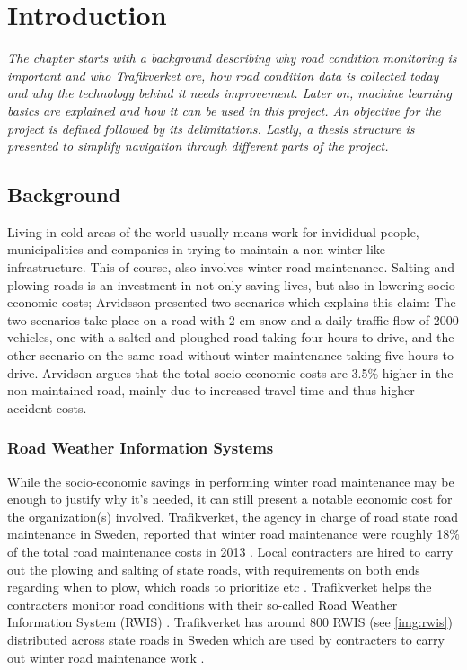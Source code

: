 \chapter{Introduction}
\emph{The chapter starts with a background describing why road condition monitoring is important and who Trafikverket are, how road condition data is collected today and why the technology behind it needs improvement. Later on, machine learning basics are explained and how it can be used in this project. An objective for the project is defined followed by its delimitations. Lastly, a thesis structure is presented to simplify navigation through different parts of the project.}

\section{Background} \label{sec:background}
	Living in cold areas of the world usually means work for invididual people, municipalities and companies in trying to maintain a non-winter-like infrastructure. This of course, also involves winter road maintenance. Salting and plowing roads is an investment in not only saving lives, but also in lowering socio-economic costs; Arvidsson \cite{ARTICLE:1} presented two scenarios which explains this claim: The two scenarios take place on a road with 2 cm snow and a daily traffic flow of 2000 vehicles, one with a salted and ploughed road taking four hours to drive, and the other scenario on the same road without winter maintenance taking five hours to drive. Arvidson argues that the total socio-economic costs are 3.5\% higher in the non-maintained road, mainly due to increased travel time and thus higher accident costs. 


	\subsection{Road Weather Information Systems}
	While the socio-economic savings in performing winter road maintenance may be enough to justify why it's needed, it can still present a notable economic cost for the organization(s) involved. Trafikverket, the agency in charge of road state road maintenance in Sweden, reported that winter road maintenance were roughly 18\% of the total road maintenance costs in 2013 \cite{REPORT:1}. Local contracters are hired to carry out the plowing and salting of state roads, with requirements on both ends regarding when to plow, which roads to prioritize etc \cite{WEBSITE:2}. Trafikverket helps the contracters monitor road conditions with their so-called Road Weather Information System (RWIS) \cite{WEBSITE:2}. Trafikverket has around 800 RWIS (see \ref{img:rwis}) distributed across state roads in Sweden which are used by contracters to carry out winter road maintenance work \cite{WEBSITE:2}. 

